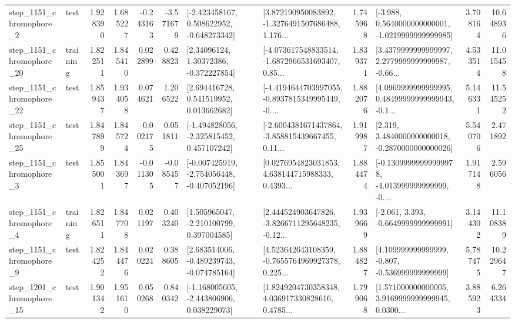 \begin{tabular}{llrrrrllrlrr}
  step\_1151\_chromophore\_2 &      test &      1.928390 &    1.685227 &     -0.243163 & -3.571679 &   [-2.423458167, 0.508622952, -0.648273342] &  [3.872190950083892, -1.3276491507686488, 1.176... &       1.745968 &  [-3.988, 0.5640000000000001, -1.0219999999999985] &            3.708164 &         10.648936 \\
 step\_1151\_chromophore\_20 &  training &      1.822511 &    1.845410 &      0.022899 &  0.428823 &      [2.34096124, 1.30372386, -0.372227854] &  [-4.073617548833514, -1.6872966531693407, 0.85... &       1.839371 &  [3.4379999999999997, 2.2779999999999987, -0.66... &            4.533514 &         11.015458 \\
 step\_1151\_chromophore\_22 &      test &      1.859437 &    1.934058 &      0.074621 &  1.206522 &     [2.694416728, 0.541519952, 0.013662682] &  [-4.4194644703997055, -0.8937815349995449, -0.... &       1.882076 &  [4.0969999999999995, 0.48499999999999943, -0.1... &            5.146331 &         11.545252 \\
 step\_1151\_chromophore\_25 &      test &      1.847899 &    1.845724 &     -0.002175 &  0.051811 &   [-1.494828056, -2.325815452, 0.457107242] &  [-2.6004381671437864, -3.858815439667455, 0.11... &       1.919987 &   [2.319, 3.4840000000000018, -0.2870000000000026] &            5.540706 &          2.471892 \\
  step\_1151\_chromophore\_3 &      test &      1.855001 &    1.843697 &     -0.011305 & -0.085457 &  [-0.007425919, -2.754056448, -0.407052196] &  [0.0276954823031853, 4.638144715988333, 0.4393... &       1.884474 &  [-0.13099999999999978, -4.013999999999999, -0.... &            1.917148 &          2.596056 \\
  step\_1151\_chromophore\_4 &  training &      1.826511 &    1.847708 &      0.021197 &  0.403240 &    [1.505965047, -2.210100799, 0.397004585] &  [2.444524903647826, -3.8266711295648235, -0.12... &       1.939669 &               [-2.061, 3.393, -0.6649999999999991] &            3.144302 &         11.108389 \\
  step\_1151\_chromophore\_9 &      test &      1.824252 &    1.844476 &      0.020224 &  0.388605 &   [2.683514006, -0.489239743, -0.074785164] &  [4.523642643108359, -0.7655764969927378, 0.225... &       1.884827 &    [4.109999999999999, -0.807, -0.536999999999999] &            5.787475 &         10.229647 \\
 step\_1201\_chromophore\_15 &      test &      1.901342 &    1.951610 &      0.050268 &  0.840342 &   [-1.168005605, -2.443806906, 0.038229073] &  [1.8249204730358348, 4.036917330828616, 0.4785... &       1.799068 &  [1.571000000000005, 3.9169999999999945, 0.0300... &            3.885923 &          6.264334 \\

\end{tabular}
